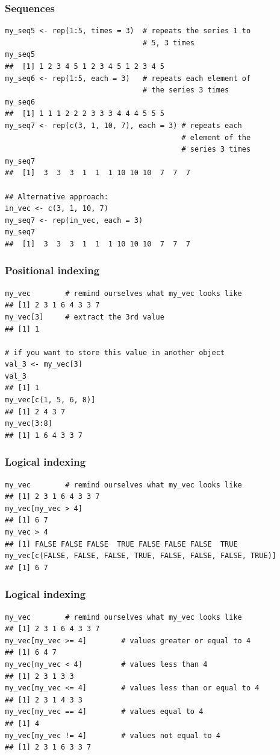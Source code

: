 \documentclass{beamer}
\newcommand{\bfr}[1]{\begin{frame}[fragile]\frametitle{{ #1 }}}
\begin{document}
\bfr{Sequences}

\begin{verbatim}
my_seq5 <- rep(1:5, times = 3)  # repeats the series 1 to 
                                # 5, 3 times
my_seq5
##  [1] 1 2 3 4 5 1 2 3 4 5 1 2 3 4 5
my_seq6 <- rep(1:5, each = 3)   # repeats each element of 
                                # the series 3 times
my_seq6
##  [1] 1 1 1 2 2 2 3 3 3 4 4 4 5 5 5
my_seq7 <- rep(c(3, 1, 10, 7), each = 3) # repeats each 
                                         # element of the 
                                         # series 3 times
my_seq7
##  [1]  3  3  3  1  1  1 10 10 10  7  7  7

## Alternative approach:
in_vec <- c(3, 1, 10, 7)
my_seq7 <- rep(in_vec, each = 3)   
my_seq7
##  [1]  3  3  3  1  1  1 10 10 10  7  7  7
\end{verbatim}
\end{frame}


\bfr{Positional indexing}

\begin{verbatim}
my_vec        # remind ourselves what my_vec looks like
## [1] 2 3 1 6 4 3 3 7
my_vec[3]     # extract the 3rd value
## [1] 1

# if you want to store this value in another object
val_3 <- my_vec[3]
val_3
## [1] 1
my_vec[c(1, 5, 6, 8)]
## [1] 2 4 3 7
my_vec[3:8]
## [1] 1 6 4 3 3 7
\end{verbatim}
\end{frame}


\bfr{Logical indexing}

\begin{verbatim}
my_vec        # remind ourselves what my_vec looks like
## [1] 2 3 1 6 4 3 3 7
my_vec[my_vec > 4]
## [1] 6 7
my_vec > 4
## [1] FALSE FALSE FALSE  TRUE FALSE FALSE FALSE  TRUE
my_vec[c(FALSE, FALSE, FALSE, TRUE, FALSE, FALSE, FALSE, TRUE)]
## [1] 6 7
\end{verbatim}
\end{frame}

\bfr{Logical indexing}

\begin{verbatim}
my_vec        # remind ourselves what my_vec looks like
## [1] 2 3 1 6 4 3 3 7
my_vec[my_vec >= 4]        # values greater or equal to 4
## [1] 6 4 7
my_vec[my_vec < 4]         # values less than 4
## [1] 2 3 1 3 3
my_vec[my_vec <= 4]        # values less than or equal to 4
## [1] 2 3 1 4 3 3
my_vec[my_vec == 4]        # values equal to 4
## [1] 4
my_vec[my_vec != 4]        # values not equal to 4
## [1] 2 3 1 6 3 3 7
\end{verbatim}
\end{frame}
\end{document}
